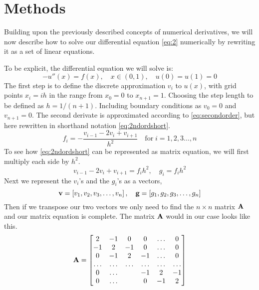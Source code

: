 \section*{Methods}
Building upon the previously described concepts of numerical derivatives, we will now describe how to solve our differential
equation \cref{eq:2}  numerically by rewriting it as a set of linear equations.
\par
To be explicit, the differential equation we will solve is:
\begin{equation*}
  -u''(x) = f(x), \quad x \in (0,1), \quad u(0)=u(1)=0
\end{equation*}
The first step is to define the discrete approximation $v_i$ to $u(x)$, with
grid points
$x_i = ih$ in the range from $x_0 = 0$ to $x_{n +1} = 1$. Choosing the step
length to be defined as $h = 1/(n+1)$. Including boundary conditions as $v_0 =
0$ and $v_{n+1} = 0$. The second derivate is approximated according to
\cref{eq:secondorder}, but here rewritten in shorthand notation \cref{eq:2ndordshort}.  
\begin{equation}\label{eq:2ndordshort}
  f_i = -\frac{v_{i-1}-2v_i + v_{i+1}}{h^2} \quad \mathrm{for} \; i = 1,2,3 \dots , n
\end{equation}
To see how \cref{eq:2ndordshort} can be represented as matrix equation, we will
first multiply each side by $h^2$.
\begin{equation*}
  v_{i-1} -2v_{i} + v_{i+1} = f_i h^2, \quad  g_i = f_i h^2
\end{equation*}
Next we represent the $v_i$'s and the $g_i$'s as a vectors,
\begin{equation*}
  \mathbf{v} = \left[v_1, v_2, v_3 ,\dots, v_{n}\right], \quad
  \mathbf{g} = \left[g_1, g_2, g_3,
  \dots, g_{n} \right]
\end{equation*}
Then if we transpose our two vectors we only need to find the $n\times n$ matrix
$\mathbf{A}$ and our matrix equation is complete. The matrix $\mathbf{A}$ would in
our case looks like this.
\begin{equation*}
  \mathbf{A} =
  \begin{bmatrix}
    2 & -1 & 0 & 0 &\dots & 0 \\
    -1 & 2 & -1 & 0 & \dots & 0 \\
     0 & -1 & 2 & -1 & \dots & 0  \\
     \dots & \dots & \dots & \dots & \dots & \dots \\
     0 & \dots & & -1 & 2 & -1 \\
     0 & \dots & & 0 & -1 & 2
  \end{bmatrix}
\end{equation*}
